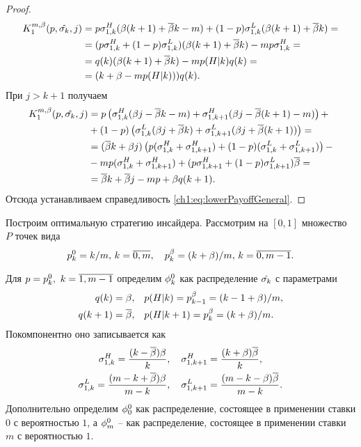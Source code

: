 {\begin{proof}
\begin{align*}
    \K*{1}(p, \sigmak, j) 
    &=
      p \sigmasc[H]{k} (\Co (k+1) + \DCo k - m) +
      (1-p) \sigmasc[L]{k} (\Co (k+1) + \DCo k) = \\
    &= (p \sigmasc[H]{k} + (1-p) \sigmasc[L]{k}) (\Co (k+1) + \DCo k)
      - m p \sigmasc[H]{k} =\\
    &= \qc{k} (\Co (k+1) + \DCo k) - m \pac{H}{k} \qc{k}  = \\
    &= (k + \Co - m \pac{H}{k})) \qc{k}.
  \end{align*}
  При $j>k+1$ получаем
  \begin{align*}
    \K*{1}(p, \sigmak, j) 
    &=
      p \left( 
      \sigmasc[H]{k} (\Co j - \DCo k - m) +
      \sigmasc[H]{k+1} (\Co j - \DCo (k+1) - m)
      \right) + \\
    &+ (1-p) \left( 
      \sigmasc[L]{k} (\Co j + \DCo k) +
      \sigmasc[L]{k+1} (\Co j + \DCo (k+1))
    \right) = \\
    &= (\DCo k + \Co j)
    \left(
      p (\sigmasc[H]{k} + \sigmasc[H]{k+1}) +
      (1-p) (\sigmasc[L]{k} + \sigmasc[L]{k+1})
    \right) - \\
    &- m p (\sigmasc[H]{k} + \sigmasc[H]{k+1}) +
    (p \sigmasc[H]{k+1} + (1-p) \sigmasc[L]{k+1}) \DCo = \\
    &= \DCo k + \DCo j - mp + \Co \qc{k+1}.
  \end{align*}
  Отсюда устанавливаем справедливость \eqref{ch1:eq:lowerPayoffGeneral}.
\end{proof}

Построим оптимальную стратегию инсайдера. Рассмотрим на $[0,1]$ множество $P$ точек вида
\[
\pEven[k] = k/m, \, k = \overline{0, m}, \quad \pOdd[k] = (k + \Co)/m, \, k = \overline{0, m - 1}.
\]

Для $p = \pEven,\ k = \overline{1, m-1}$ определим $\fEven$ как распределение $\sigmak$ с параметрами
\begin{align*}
  \qc{k} = \Co,& \quad \pac{H}{k} = \pOdd[k-1] = (k-1+\Co)/m,\\
  \qc{k+1} = \DCo,& \quad \pac{H}{k+1} = \pOdd[k] = (k+\Co)/m.
\end{align*}
Покомпонентно оно записывается как
\begin{gather*}
  \sigmasc[H]{k} = \frac{(k-\DCo)\Co}{k},\quad 
  \sigmasc[H]{k+1} = \frac{(k+\Co)\DCo}{k},\\
  \sigmasc[L]{k} = \frac{(m - k + \DCo)\Co}{m - k},\quad 
  \sigmasc[L]{k+1} = \frac{(m - k - \Co)\DCo}{m - k}.
\end{gather*}
Дополнительно определим $\fEven[0]$ как распределение, состоящее в применении ставки $0$ с вероятностью $1$, а $\fEven[m]$ -- как распределение, состоящее в применении ставки $m$ с вероятностью $1$.

}
